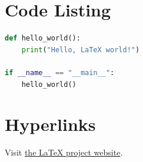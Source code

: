 \documentclass[12pt,a4paper]{article}
\begin{document}
    \clearpage %
    \section{Code Listing}
    \begin{lstlisting}[language=Python, caption=Sample Python code]
def hello_world():
    print("Hello, LaTeX world!")

if __name__ == "__main__":
    hello_world()
    \end{lstlisting}

    \section{Hyperlinks}
    Visit \href{https://www.latex-project.org/}{the \LaTeX{} project website}.
\end{document}
